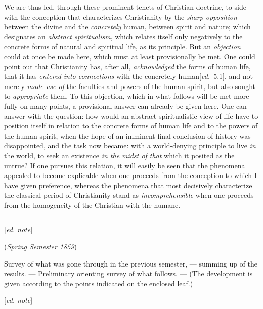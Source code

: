 \documentclass[12pt,a4paper,openany]{book}
\newcommand{\kpage}[1]{\marginnote{\footnotesize\textit{[#1]}}}
\newcommand{\ed}[1]{{\small[\textit{ed.}\ #1]}}
\newcommand{\ednote}[1]{{\small[\textit{ed. note}]}}
\newcommand{\coursetitle}[1]{\par\medskip\noindent #1\par\medskip}
\newcommand{\lecture}[1]{\par\bigskip\noindent{\large #1}\par\nobreak\medskip}
\newcommand{\sepline}{\par\begin{center}\rule{2cm}{0.4pt}\end{center}\par}
\begin{document}
We are thus led, through these prominent tenets of
Christian doctrine, to side with the conception that characterizes
Christianity by the \emph{sharp opposition} between the divine
and the \emph{concretely} human, between spirit and nature;
which designates an \emph{abstract spiritualism}, which relates itself only negatively
\kpage{91}to the concrete forms of natural and spiritual life, as its principle.
But an \emph{objection} could at once be made here, which must at least
provisionally be met. One could point out that Christianity
has, after all, \emph{acknowledged} the forms of human life, that it
has \emph{entered into connections} with the concretely human\ed{5.1}, and not
merely \emph{made use of} the faculties and powers of the human spirit, but also
sought to \emph{appropriate} them. To this objection, which in what follows will be met
more fully on many points, a provisional answer can already
be given here. One can answer with the question:
how would an abstract-spiritualistic view of life have to position itself in
relation to the concrete forms of human life and to the powers of the
human spirit, when the hope of an imminent
final conclusion of history was disappointed, and the task now became:
with a world-denying principle to live \emph{in} the world, to seek an existence
\emph{in the midst of that} which it posited as the untrue? If one pursues this
relation, it will easily be seen that the phenomena appealed to become
explicable when one proceeds from the conception to which I have given preference,
whereas the phenomena that most decisively characterize
the classical period of Christianity stand as \emph{incomprehensible} when one
proceeds from the homogeneity of the Christian with the humane. ---

\sepline

\ednote{}

\kpage{92}

\coursetitle{\ed{44.2} (\emph{Spring Semester 1859})}

\lecture{Lecture 1}

Survey of what was gone through in the previous semester, --- summing up
of the results. --- Preliminary orienting survey of what follows.
--- (The development is given according to the points indicated
on the enclosed leaf.)

\ednote{}
\end{document}
